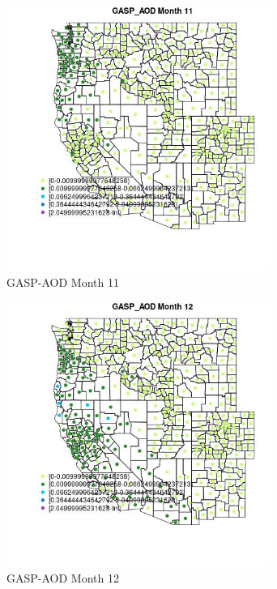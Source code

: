 \begin{figure} 
\centering  
\includegraphics[width=0.77\textwidth]{Code_Outputs/df_report_ML_predictors_CountyCentroid_Locations_Dates_2008-01-01to2018-12-31_MapObsMo11GASP_AOD.jpg} 
\caption{\label{fig:df_report_ML_predictors_CountyCentroid_Locations_Dates_2008-01-01to2018-12-31MapObsMo11GASP_AOD}GASP-AOD Month 11} 
\end{figure} 
 

\begin{figure} 
\centering  
\includegraphics[width=0.77\textwidth]{Code_Outputs/df_report_ML_predictors_CountyCentroid_Locations_Dates_2008-01-01to2018-12-31_MapObsMo12GASP_AOD.jpg} 
\caption{\label{fig:df_report_ML_predictors_CountyCentroid_Locations_Dates_2008-01-01to2018-12-31MapObsMo12GASP_AOD}GASP-AOD Month 12} 
\end{figure} 
 

